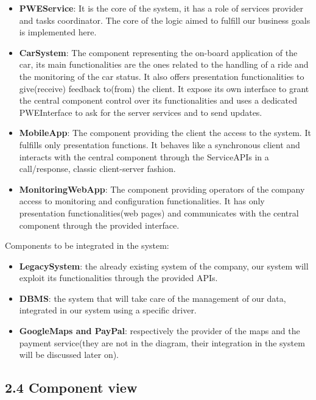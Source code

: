 \documentclass[]{article}
\providecommand{\tightlist}{%
  \setlength{\itemsep}{0pt}\setlength{\parskip}{0pt}}
\begin{document}
\begin{itemize}
\tightlist
\item
  \textbf{PWEService}: It is the core of the system, it has a role of
  services provider and tasks coordinator. The core of the logic aimed
  to fulfill our business goals is implemented here.
\item
  \textbf{CarSystem}: The component representing the on-board
  application of the car, its main functionalities are the ones related
  to the handling of a ride and the monitoring of the car status. It
  also offers presentation functionalities to give(receive) feedback
  to(from) the client. It expose its own interface to grant the central
  component control over its functionalities and uses a dedicated
  PWEInterface to ask for the server services and to send updates.
\item
  \textbf{MobileApp}: The component providing the client the access to
  the system. It fulfills only presentation functions. It behaves like a
  synchronous client and interacts with the central component through
  the ServiceAPIs in a call/response, classic client-server fashion.
\item
  \textbf{MonitoringWebApp}: The component providing operators of the
  company access to monitoring and configuration functionalities. It has
  only presentation functionalities(web pages) and communicates with the
  central component through the provided interface.
\end{itemize}

Components to be integrated in the system:

\begin{itemize}
\tightlist
\item
  \textbf{LegacySystem}: the already existing system of the company, our
  system will exploit its functionalities through the provided APIs.
\item
  \textbf{DBMS}: the system that will take care of the management of our
  data, integrated in our system using a specific driver.
\item
  \textbf{GoogleMaps and PayPal}: respectively the provider of the maps
  and the payment service(they are not in the diagram, their integration
  in the system will be discussed later on).
\end{itemize}

\subsection{2.4 Component view}\label{component-view}
\end{document}
